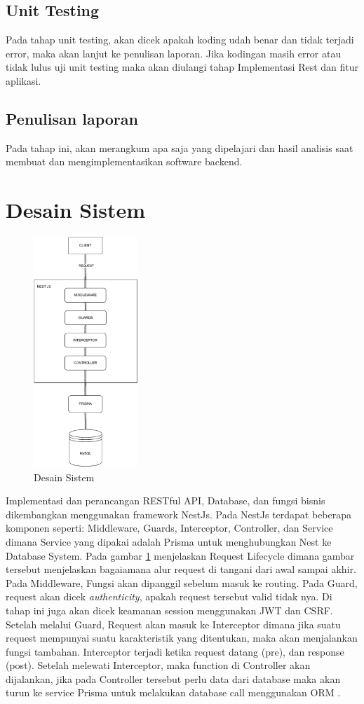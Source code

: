 \subsection{Unit Testing}
Pada tahap unit testing, akan dicek apakah koding udah benar dan tidak terjadi error, maka akan lanjut ke penulisan laporan. Jika kodingan masih error atau tidak lulus uji unit testing maka akan diulangi tahap Implementasi Rest dan fitur aplikasi.

\subsection{Penulisan laporan}
Pada tahap ini, akan merangkum apa saja yang dipelajari dan hasil analisis saat membuat dan mengimplementasikan software backend.

\section{Desain Sistem}
\begin{figure}[h]
	\centering
	\includegraphics[width=0.35\textwidth]{drawio/sistem-desain.drawio.pdf}
	\caption{Desain Sistem}
	\label{sistem-desain}
\end{figure}
Implementasi dan perancangan RESTful API, Database, dan fungsi bisnis dikembangkan menggunakan framework NestJs. Pada NestJs terdapat beberapa komponen seperti: Middleware, Guards, Interceptor, Controller, dan Service dimana Service yang dipakai adalah Prisma untuk menghubungkan Nest ke Database System. Pada gambar \ref{sistem-desain} menjelaskan Request Lifecycle dimana gambar tersebut menjelaskan bagaiamana alur request di tangani dari awal sampai akhir.
Pada Middleware, Fungsi akan dipanggil sebelum masuk ke routing. Pada Guard, request akan dicek \textit{authenticity}, apakah request tersebut valid tidak nya. Di tahap ini juga akan dicek keamanan session menggunakan JWT dan CSRF. Setelah melalui Guard, Request akan masuk ke Interceptor dimana jika suatu request mempunyai suatu karakteristik yang ditentukan, maka akan menjalankan fungsi tambahan. Interceptor terjadi ketika request datang (pre), dan response (post). Setelah melewati Interceptor, maka function di Controller akan dijalankan, jika pada Controller tersebut perlu data dari database maka akan turun ke service Prisma untuk melakukan database call menggunakan ORM \cite{NestJS}.

